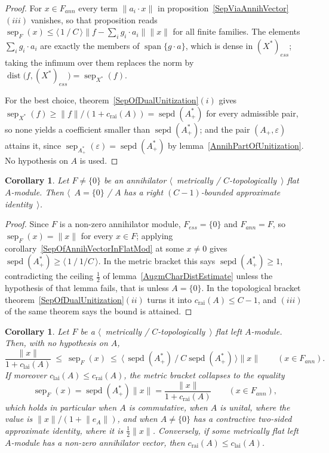 \documentclass[11pt]{article}
\theoremstyle{plain}
\newtheorem{corollary}[theorem]{Corollary}
\theoremstyle{definition}
\DeclareMathOperator{\dist}{dist}
\DeclareMathOperator{\sep}{sep}
\DeclareMathOperator{\sepd}{sepd}
\newcommand{\crai}{c_{\mathrm{rai}}}
\newcommand{\clai}{c_{\mathrm{lai}}}
\begin{document}
\begin{proof}
For $x\in F_{ann}$ every term $\lVert a_i\cdot x\rVert$ in
proposition~\ref{SepViaAnnihVector}$(iii)$ vanishes, so that proposition reads
$\sep_F(x)\leq\langle\,1\ /\ C\,\rangle
\lVert f-\sum_i g_i\cdot a_i\rVert\lVert x\rVert$ for all finite families. The
elements $\sum_i g_i\cdot a_i$ are exactly the members of
$\operatorname{span} \{g\cdot a \}$, which is dense in ${(X^*)}_{ess}$; taking
the infimum over them replaces the norm by
$\dist \bigl(f,{(X^*)}_{ess} \bigr)=\sep_{X^*}(f)$.

For the best choice, theorem~\ref{SepOfDualUnitization}$(i)$ gives
$\sep_{X^*}(f)\geq\lVert f\rVert/(1+\crai(A))=\sepd(A_+^*)$ for every admissible
pair, so none yields a coefficient smaller than $\sepd(A_+^*)$; and the pair
$(A_+,\varepsilon)$ attains it, since
$\sep_{A_+^*}(\varepsilon)=\sepd(A_+^*)$ by
lemma~\ref{AnnihPartOfUnitization}. No hypothesis on $A$ is used.
\end{proof}

\begin{corollary}\label{FlatAnnihModHaveApprIdent}
Let $F\neq \{0 \}$ be an annihilator
$\langle$~metrically / $C$-topologically~$\rangle$ flat $A$-module. Then
$\langle$~$A= \{0 \}$ / $A$ has a right $(C-1)$-bounded approximate
identity~$\rangle$.
\end{corollary}

\begin{proof}
Since $F$ is a non-zero annihilator module, $F_{ess}= \{0 \}$ and $F_{ann}=F$, so
$\sep_F(x)=\lVert x\rVert$ for every $x\in F$; applying
corollary~\ref{SepOfAnnihVectorInFlatMod} at some $x\neq 0$ gives
$\sepd(A_+^*)\geq\langle\,1\ /\ 1/C\,\rangle$. In the metric bracket this says
$\sepd(A_+^*)\geq 1$, contradicting the ceiling $\tfrac{1}{2}$ of
lemma~\ref{AugmCharDistEstimate} unless the hypothesis of that lemma fails, that
is unless $A= \{0 \}$. In the topological bracket
theorem~\ref{SepOfDualUnitization}$(ii)$ turns it into $\crai(A)\leq C-1$, and
$(iii)$ of the same theorem says the bound is attained.
\end{proof}

\begin{corollary}\label{ExactSepOfAnnihVectorInFlatMod}
Let $F$ be a $\langle$~metrically / $C$-topologically~$\rangle$ flat left
$A$-module. Then, with no hypothesis on $A$,
\[
\frac{\lVert x\rVert}{1+\clai(A)}\ \leq\ \sep_F(x)\ \leq\
\langle\,\sepd(A_+^*)\ /\ C\sepd(A_+^*)\,\rangle\lVert x\rVert
\qquad(x\in F_{ann}).
\]
If moreover $\clai(A)\leq\crai(A)$, the metric bracket collapses to the equality
\[
\sep_F(x)=\sepd(A_+^*)\lVert x\rVert=\frac{\lVert x\rVert}{1+\crai(A)}
\qquad(x\in F_{ann}),
\]
which holds in particular when $A$ is commutative, when $A$ is unital, where the
value is $\lVert x\rVert/(1+\lVert e_A\rVert)$, and when $A\neq \{0 \}$ has a
contractive two-sided approximate identity, where it is $\tfrac{1}{2}\lVert
x\rVert$. Conversely, if some metrically flat left $A$-module has a non-zero
annihilator vector, then $\crai(A)\leq\clai(A)$.
\end{corollary}
\end{document}
